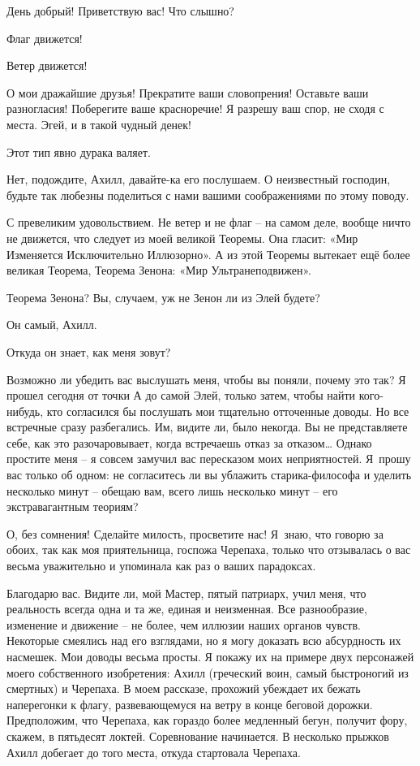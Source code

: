 \documentclass[../main.tex]{subfiles}
\begin{document}
\begin{Dialogue}

 День добрый! Приветствую вас! Что слышно?

 Флаг движется!

 Ветер движется!

 О мои дражайшие друзья! Прекратите ваши словопрения! Оставьте ваши разногласия! Поберегите ваше красноречие! Я разрешу ваш спор, не сходя с места. Эгей, и в такой чудный денек!

 Этот тип явно дурака валяет.

 Нет, подождите, Ахилл, давайте-ка его послушаем. О неизвестный господин, будьте так любезны поделиться с нами вашими соображениями по этому поводу.

 С превеликим удовольствием. Не ветер и не флаг \--- на самом деле, вообще ничто не движется, что следует из моей великой Теоремы. Она гласит: «Мир Изменяется Исключительно Иллюзорно». А из этой Теоремы вытекает ещё более великая Теорема, Теорема Зенона: «Мир Ультранеподвижен».

 Теорема Зенона? Вы, случаем, уж не Зенон ли из Элей будете?

 Он самый, Ахилл.

 Откуда он знает, как меня зовут?

 Возможно ли убедить вас выслушать меня, чтобы вы поняли, почему это так? Я прошел сегодня от точки А до самой Элей, только затем, чтобы найти кого-нибудь, кто согласился бы послушать мои тщательно отточенные доводы. Но все встречные сразу разбегались. Им, видите ли, было некогда. Вы не представляете себе, как это разочаровывает, когда встречаешь отказ за отказом\ldots{} Однако простите меня \--- я совсем замучил вас пересказом моих неприятностей. Я~прошу вас только об одном: не согласитесь ли вы ублажить старика-философа и уделить несколько минут \--- обещаю вам, всего лишь несколько минут \--- его экстравагантным теориям?

 О, без сомнения! Сделайте милость, просветите нас! Я~знаю, что говорю за обоих, так как моя приятельница, госпожа Черепаха, только что отзывалась о вас весьма уважительно и упоминала как раз о ваших парадоксах.

 Благодарю вас. Видите ли, мой Мастер, пятый патриарх, учил меня, что реальность всегда одна и та же, единая и неизменная. Все разнообразие, изменение и движение \--- не более, чем иллюзии наших органов чувств. Некоторые смеялись над его взглядами, но я могу доказать всю абсурдность их насмешек. Мои доводы весьма просты. Я покажу их на примере двух персонажей моего собственного изобретения: Ахилл (греческий воин, самый быстроногий из смертных) и Черепаха. В моем рассказе, прохожий убеждает их бежать наперегонки к флагу, развевающемуся на ветру в конце беговой дорожки. Предположим, что Черепаха, как гораздо более медленный бегун, получит фору, скажем, в пятьдесят локтей. Соревнование начинается. В несколько прыжков Ахилл добегает до того места, откуда стартовала Черепаха.


\end{Dialogue}
\end{document}
